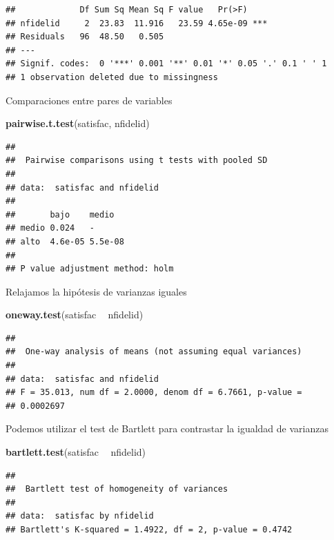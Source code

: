 \documentclass[]{book}
\newenvironment{Shaded}{\begin{snugshade}}{\end{snugshade}}
\newcommand{\KeywordTok}[1]{\textcolor[rgb]{0.13,0.29,0.53}{\textbf{#1}}}
\newcommand{\StringTok}[1]{\textcolor[rgb]{0.31,0.60,0.02}{#1}}
\newcommand{\OperatorTok}[1]{\textcolor[rgb]{0.81,0.36,0.00}{\textbf{#1}}}
\newcommand{\NormalTok}[1]{#1}
\begin{document}
\begin{verbatim}
##             Df Sum Sq Mean Sq F value   Pr(>F)    
## nfidelid     2  23.83  11.916   23.59 4.65e-09 ***
## Residuals   96  48.50   0.505                     
## ---
## Signif. codes:  0 '***' 0.001 '**' 0.01 '*' 0.05 '.' 0.1 ' ' 1
## 1 observation deleted due to missingness
\end{verbatim}

Comparaciones entre pares de variables

\begin{Shaded}
\begin{Highlighting}[]
\KeywordTok{pairwise.t.test}\NormalTok{(satisfac, nfidelid)}
\end{Highlighting}
\end{Shaded}

\begin{verbatim}
## 
##  Pairwise comparisons using t tests with pooled SD 
## 
## data:  satisfac and nfidelid 
## 
##       bajo    medio  
## medio 0.024   -      
## alto  4.6e-05 5.5e-08
## 
## P value adjustment method: holm
\end{verbatim}

Relajamos la hipótesis de varianzas iguales

\begin{Shaded}
\begin{Highlighting}[]
\KeywordTok{oneway.test}\NormalTok{(satisfac }\OperatorTok{~}\StringTok{ }\NormalTok{nfidelid)}
\end{Highlighting}
\end{Shaded}

\begin{verbatim}
## 
##  One-way analysis of means (not assuming equal variances)
## 
## data:  satisfac and nfidelid
## F = 35.013, num df = 2.0000, denom df = 6.7661, p-value =
## 0.0002697
\end{verbatim}

Podemos utilizar el test de Bartlett para contrastar la igualdad de
varianzas

\begin{Shaded}
\begin{Highlighting}[]
\KeywordTok{bartlett.test}\NormalTok{(satisfac }\OperatorTok{~}\StringTok{ }\NormalTok{nfidelid)}
\end{Highlighting}
\end{Shaded}

\begin{verbatim}
## 
##  Bartlett test of homogeneity of variances
## 
## data:  satisfac by nfidelid
## Bartlett's K-squared = 1.4922, df = 2, p-value = 0.4742
\end{verbatim}
\end{document}
